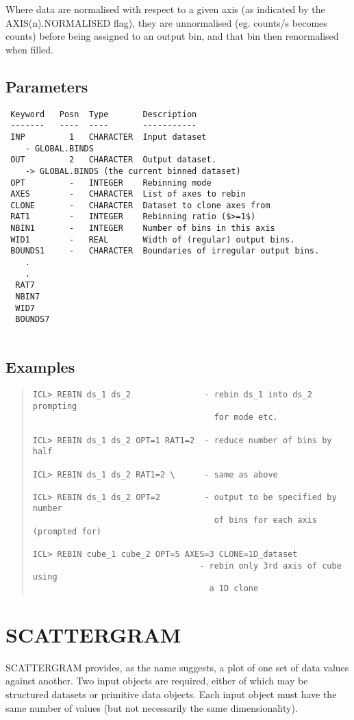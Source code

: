 \documentclass{book}
\renewcommand{\_}{{\tt\char'137}}     %
\begin{document}
Where data are normalised with respect to a given axis (as
indicated by the AXIS(n).NORMALISED flag), they are unnormalised
(eg. counts/s becomes counts) before being assigned to an output bin,
and that bin then renormalised when filled.
 
\subsection{Parameters}
\begin{verbatim}
 Keyword   Posn  Type       Description
 -------   ----  ----       -----------
 INP         1   CHARACTER  Input dataset
    - GLOBAL.BINDS
 OUT         2   CHARACTER  Output dataset.
    -> GLOBAL.BINDS (the current binned dataset)
 OPT         -   INTEGER    Rebinning mode
 AXES        -   CHARACTER  List of axes to rebin
 CLONE       -   CHARACTER  Dataset to clone axes from
 RAT1        -   INTEGER    Rebinning ratio ($>=1$)
 NBIN1       -   INTEGER    Number of bins in this axis
 WID1        -   REAL       Width of (regular) output bins.
 BOUNDS1     -   CHARACTER  Boundaries of irregular output bins.
    .
    .
  RAT7
  NBIN7
  WID7
  BOUNDS7
 
\end{verbatim}\subsection{Examples}
\begin{quote}\begin{verbatim}
ICL> REBIN ds_1 ds_2               - rebin ds_1 into ds_2 prompting
                                     for mode etc.
 
ICL> REBIN ds_1 ds_2 OPT=1 RAT1=2  - reduce number of bins by half
 
ICL> REBIN ds_1 ds_2 RAT1=2 \      - same as above
 
ICL> REBIN ds_1 ds_2 OPT=2         - output to be specified by number
                                     of bins for each axis (prompted for)
 
ICL> REBIN cube_1 cube_2 OPT=5 AXES=3 CLONE=1D_dataset
                                  - rebin only 3rd axis of cube using
                                    a 1D clone
\end{verbatim}\end{quote}
\section{SCATTERGRAM}
SCATTERGRAM provides, as the name suggests, a plot of one
set of data values against another. Two input objects are
required, either of which may be structured datasets or
primitive data objects. Each input object must have the
same number of values (but not necessarily the same
dimensionality).
 
\end{document}
